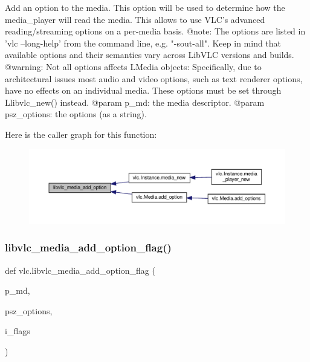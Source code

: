\begin{DoxyVerb}Add an option to the media.
This option will be used to determine how the media_player will
read the media. This allows to use VLC's advanced
reading/streaming options on a per-media basis.
@note: The options are listed in 'vlc --long-help' from the command line,
e.g. "-sout-all". Keep in mind that available options and their semantics
vary across LibVLC versions and builds.
@warning: Not all options affects L{Media} objects:
Specifically, due to architectural issues most audio and video options,
such as text renderer options, have no effects on an individual media.
These options must be set through L{libvlc_new}() instead.
@param p_md: the media descriptor.
@param psz_options: the options (as a string).
\end{DoxyVerb}
 Here is the caller graph for this function\+:
\nopagebreak
\begin{figure}[H]
\begin{center}
\leavevmode
\includegraphics[width=350pt]{namespacevlc_adbf254196790831139b165b8f20bab19_icgraph}
\end{center}
\end{figure}
\mbox{\label{namespacevlc_a7dc1f3fd16f555dec3a3bf5466c86d5f}} 
\subsubsection{\texorpdfstring{libvlc\+\_\+media\+\_\+add\+\_\+option\+\_\+flag()}{libvlc\_media\_add\_option\_flag()}}
{\footnotesize\ttfamily def vlc.\+libvlc\+\_\+media\+\_\+add\+\_\+option\+\_\+flag (\begin{DoxyParamCaption}\item[{}]{p\+\_\+md,  }\item[{}]{psz\+\_\+options,  }\item[{}]{i\+\_\+flags }\end{DoxyParamCaption})}

